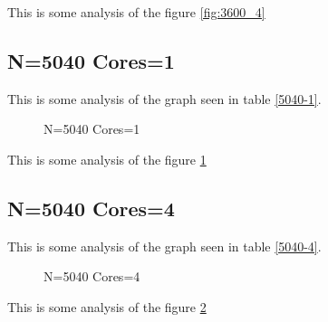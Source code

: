 \documentclass[a4paper]{article}
\begin{document}
This is some analysis of the figure \ref{fig:3600_4}

\subsection{N=5040 Cores=1}

This is some analysis of the graph seen in table \ref{5040-1}.

\begin{figure}
    
    \caption{N=5040 Cores=1}
    \label{fig:5040_1}
\end{figure}

This is some analysis of the figure \ref{fig:5040_1}

\subsection{N=5040 Cores=4}

This is some analysis of the graph seen in table \ref{5040-4}.

\begin{figure}
    
    \caption{N=5040 Cores=4}
    \label{fig:5040_4}
\end{figure}

This is some analysis of the figure \ref{fig:5040_4}
\end{document}
